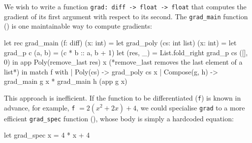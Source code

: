 We wish to write a function \texttt{grad: diff -> float -> float} that computes the gradient of its first argument with respect to its second. The \texttt{grad_main} function () is one maintainable way to compute gradients: 

\begin{code}
\begin{ocamllst}
let rec grad_main (f: diff) (x: int) = 
  let grad_poly (cs: int list) (x: int) = 
    let grad_p c (a, b) = (c * b :: a, b + 1) 
    let (res, _) = List.fold_right grad_p cs ([], 0) in 
    app Poly(remove_last res) x (*remove_last removes the last element of a list*)
  in match f with
    | Poly(cs)      -> grad_poly cs x
    | Compose(g, h) -> grad_main g x * grad_main h (app g x)

\end{ocamllst}
%
\label{listing:ocaml-grad-main}
\end{code}


This approach is inefficient. If the function to be differentiated (\texttt{f}) is known in advance, for example, \texttt{f} $= 2(x^2 + 2x) + 4$, we could specialise \texttt{grad} to a more efficient \texttt{grad_spec} function (), whose body is simply a hardcoded equation:

\begin{code}
\begin{ocamllst}
let grad_spec x = 4 * x + 4
\end{ocamllst}
\label{listing:ocaml-grad-fast}
\end{code}    


